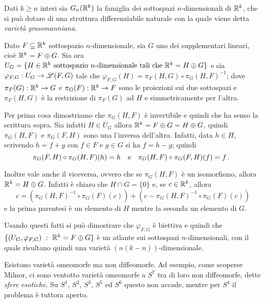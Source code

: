 \begin{example}  %
	Dati $k \geq n$ interi sia $G_n(\mathbb R^k)$ la famiglia dei sottospazi $n$-dimensionali di $\mathbb R^k$, che si può dotare di una struttura differenziabile naturale con la quale viene detta \emph{varietà grassmanniana}.
 
	Dato $F \subseteq \mathbb R^k$ sottospazio $n$-dimensionale, sia $G$ uno dei supplementari lineari, cioè $\mathbb R^k=F \oplus G$.
	Sia ora $U_G=\{H\in \mathbb R^k \text{ sottospazio $n$-dimensionale tali che }\mathbb R^k=H \oplus G\}$ e sia $\varphi_{F,G}:U_G \to \mathscr L(F,G)$ tale che $\varphi_{F,G}(H)=\pi_F(H,G) \circ \pi_G(H,F)^{-1}$; dove $\pi_F(G):\mathbb R^k \to G$ e $\pi_G(F):\mathbb R^k \to F$ sono le proiezioni sui due sottospazi e $\pi_F(H,G)$ è la restrizione di $\pi_F(G)$ ad $H$ e simmetricamente per l'altra. 
 
	Per prima cosa dimostriamo che $\pi_G(H,F)$ è invertibile e quindi che ha senso la scrittura sopra.
	Sia infatti $H \in U_G$ allora $\mathbb R^k=F \oplus G=H \oplus G$, quindi $\pi_G(H,F)$ e $\pi_G(F,H)$ sono una l'inversa dell'altra. Infatti, data $h\in H$, scrivendo $h=f+g$ con $f \in F$ e $g \in G$ si ha $f=h-g$; quindi
 \begin{equation*}
 \pi_G(F,H) \circ \pi_G(H,F)(h)=h \quad \text{e} \quad \pi_G(H,F) \circ \pi_G(F,H)(f)=f \, \text{. }
 \end{equation*}
 
 Inoltre vale anche il viceversa, ovvero che se $\pi_G(H,F)$ è un isomorfismo, allora $\mathbb R^k=H \oplus G$. Infatti
 è chiaro che $H \cap G=\{0\}$ e, se $c \in \mathbb R^k$, allora
 \begin{equation*}
 c=(\pi_G(H,F)^{-1} \circ \pi_G(F)(c))+(c-\pi_G(H,F)^{-1} \circ \pi_G(F)(c))
 \end{equation*}
 e la prima parentesi
 è un elemento di $H$ mentre la seconda un elemento di $G$.
 
 Usando questi fatti si può dimostrare che $\varphi_{F,G}$ è biettiva e quindi che $\{(U_G,\varphi_{F,G}) \ :\  \mathbb R^k=F \oplus G \}$ è 
 un atlante sui sottospazi $n$-dimensionali, con il quale risultano quindi una varietà $(n(k-n))$-dimensionale.
 
 \end{example}

 
 \begin{remark} 
  Esistono varietà omeomorfe ma non diffeomorfe. Ad esempio, come scoperse Milnor, ci sono ventotto varietà
  omeomorfe a $S^7$ tra di loro non diffeomorfe, dette \emph{sfere esotiche}. Su $S^1$, $S^2$, $S^3$, $S^5$
  ed $S^6$ questo non accade, mentre per $S^4$ il problema è tuttora aperto.
 \end{remark}
 
